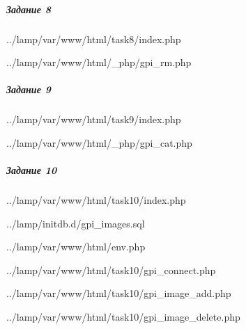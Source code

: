 
\subparagraph{Задание 8} \hspace{0pt}


{../lamp/var/www/html/task8/index.php}


{../lamp/var/www/html/_php/gpi_rm.php}


\subparagraph{Задание 9} \hspace{0pt}


{../lamp/var/www/html/task9/index.php}


{../lamp/var/www/html/_php/gpi_cat.php}


\subparagraph{Задание 10} \hspace{0pt}


{../lamp/var/www/html/task10/index.php}


{../lamp/initdb.d/gpi_images.sql}


{../lamp/var/www/html/env.php}


{../lamp/var/www/html/task10/gpi_connect.php}


{../lamp/var/www/html/task10/gpi_image_add.php}


{../lamp/var/www/html/task10/gpi_image_delete.php}
